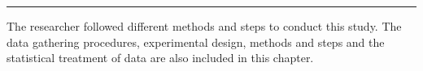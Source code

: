 
\vspace{-1cm}\noindent\rule{\textwidth}{0.4pt}

The researcher followed different methods and 
steps to conduct this study. The data gathering
procedures, experimental design, methods and steps 
and the statistical treatment of data are also 
included in this chapter.

% 